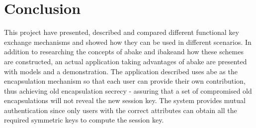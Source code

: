 \chapter{Conclusion}\label{cha:conclusion}
This project have presented, described and compared different functional key exchange mechanisms and showed how they can be used in different scenarios. In addition to researching the concepts of \gls{abake} and \gls{ibake}and how these schemes are constructed, an actual application taking advantages of \gls{abake} are presented with models and a demonstration. The application described uses \gls{abe} as the encapsulation mechanism so that each user can provide their own contribution, thus achieving old encapsulation secrecy - assuring that a set of compromised old encapsulations will not reveal the new session key. The system provides mutual authentication since only users with the correct attributes can obtain all the required symmetric keys to compute the session key. 
